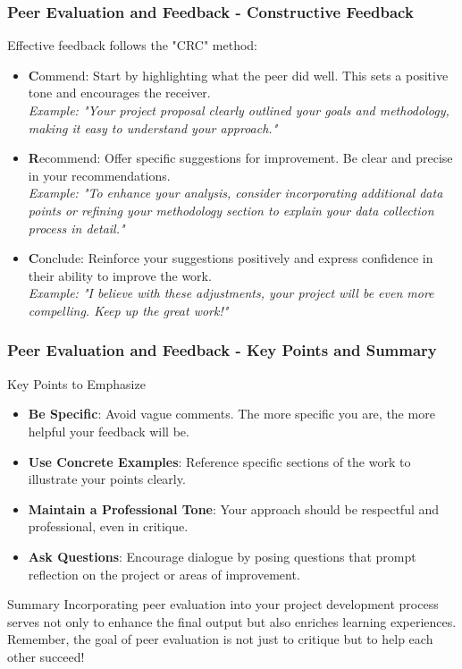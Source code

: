 \documentclass[aspectratio=169]{beamer}
\begin{document}
\begin{frame}[fragile]
    \frametitle{Peer Evaluation and Feedback - Constructive Feedback}
    Effective feedback follows the "CRC" method:

    \begin{itemize}
        \item \textbf{C}ommend: Start by highlighting what the peer did well. This sets a positive tone and encourages the receiver.
        \\ \textit{Example: "Your project proposal clearly outlined your goals and methodology, making it easy to understand your approach."}
        
        \item \textbf{R}ecommend: Offer specific suggestions for improvement. Be clear and precise in your recommendations.
        \\ \textit{Example: "To enhance your analysis, consider incorporating additional data points or refining your methodology section to explain your data collection process in detail."}
        
        \item \textbf{C}onclude: Reinforce your suggestions positively and express confidence in their ability to improve the work.
        \\ \textit{Example: "I believe with these adjustments, your project will be even more compelling. Keep up the great work!"}
    \end{itemize}
\end{frame}

\begin{frame}[fragile]
    \frametitle{Peer Evaluation and Feedback - Key Points and Summary}
    \begin{block}{Key Points to Emphasize}
        \begin{itemize}
            \item \textbf{Be Specific}: Avoid vague comments. The more specific you are, the more helpful your feedback will be.
            \item \textbf{Use Concrete Examples}: Reference specific sections of the work to illustrate your points clearly.
            \item \textbf{Maintain a Professional Tone}: Your approach should be respectful and professional, even in critique.
            \item \textbf{Ask Questions}: Encourage dialogue by posing questions that prompt reflection on the project or areas of improvement.
        \end{itemize}
    \end{block}

    \begin{block}{Summary}
        Incorporating peer evaluation into your project development process serves not only to enhance the final output but also enriches learning experiences. 
        Remember, the goal of peer evaluation is not just to critique but to help each other succeed!
    \end{block}
\end{frame}
\end{document}
